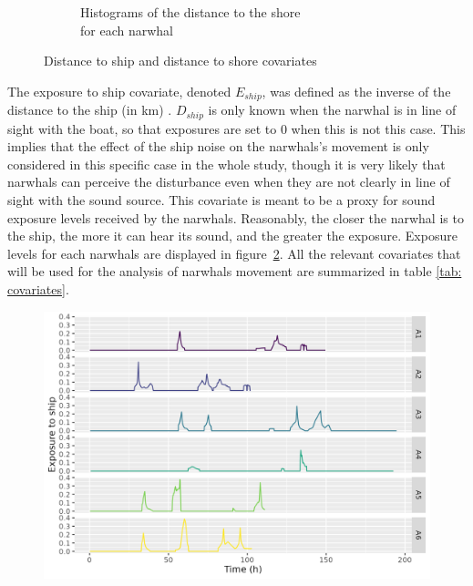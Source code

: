 \documentclass[11pt]{article}
\newcommand {\1}{\mathbb{1}}
\begin{document}
\begin{figure}[H]
\begin{subfigure}{0.48\textwidth}
    \caption{Histograms of the distance to the shore \\ for each narwhal}
    \end{subfigure}
    \caption{Distance to ship and distance to shore covariates}
    \label{fig: distance to shore and distance to ship histograms}
\end{figure}


The exposure to ship covariate, denoted $E_{ship}$, was defined as the inverse of the distance to the ship (in km) \cite{heide-jorgensen_behavioral_2021}.
$D_{ship}$ is only known when the narwhal is in line of sight with the boat, so that exposures are set to $0$ when this is not this case. This implies that the effect of the ship noise on the narwhals's movement is only considered in this specific case in the whole study, though it is very likely that narwhals can perceive the disturbance even when they are not clearly in line of sight with the sound source. This covariate is meant to be a proxy for sound exposure levels received by the narwhals. Reasonably, the closer the narwhal is to the ship, the more it can hear its sound, and the greater the exposure. Exposure levels for each narwhals are displayed in figure~\ref{fig: realexpthroughtime}. All the relevant covariates that will be used for the analysis of narwhals movement are summarized in table \ref{tab: covariates}.


\begin{figure}[H]
	\centering
	\includegraphics[width=0.7\linewidth]{images/data_exploration/realExp_through_time}
	\caption{}
	\label{fig: realexpthroughtime}
\end{figure}
\end{document}
